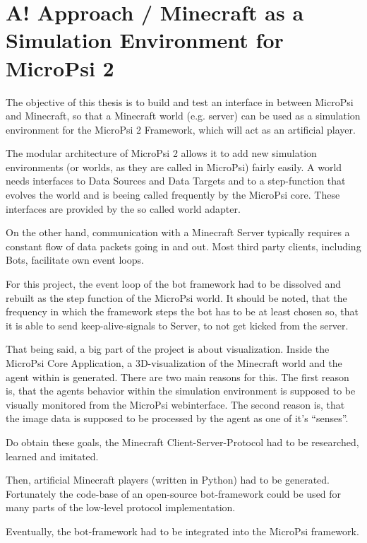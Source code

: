 \chapter{A! Approach / Minecraft as a Simulation Environment for MicroPsi 2}

The objective of this thesis is to build and test an interface in between MicroPsi and Minecraft, so that a Minecraft world (e.g. server) can be used as a simulation environment for the MicroPsi 2 Framework, which will act as an artificial player.

The modular architecture of MicroPsi 2 allows it to add new simulation environments (or worlds, as they are called in MicroPsi) fairly easily. A world needs interfaces to Data Sources and Data Targets and to a step-function that evolves the world and is beeing called frequently by the MicroPsi core. These interfaces are provided by the so called world adapter. 

On the other hand, communication with a Minecraft Server typically requires a constant flow of data packets going in and out. Most third party clients, including Bots, facilitate own event loops. 

For this project, the event loop of the bot framework had to be dissolved and rebuilt as the step function of the MicroPsi world. It should be noted, that the frequency in which the framework steps the bot has to be at least chosen so, that it is able to send keep-alive-signals to Server, to not get kicked from the server.

That being said, a big part of the project is about visualization. Inside the MicroPsi Core Application, a 3D-visualization of the Minecraft world and the agent within is generated. There are two main reasons for this. The first reason is, that the agents behavior within the simulation environment is supposed to be visually monitored from the MicroPsi webinterface. The second reason is, that the image data is supposed to be processed by the agent as one of it's ``senses''.

Do obtain these goals, the Minecraft Client-Server-Protocol had to be researched, learned and imitated.

Then, artificial Minecraft players (written in Python) had to be generated. Fortunately the code-base of an open-source bot-framework could be used for many parts of the low-level protocol implementation.

Eventually, the bot-framework had to be integrated into the MicroPsi framework.

